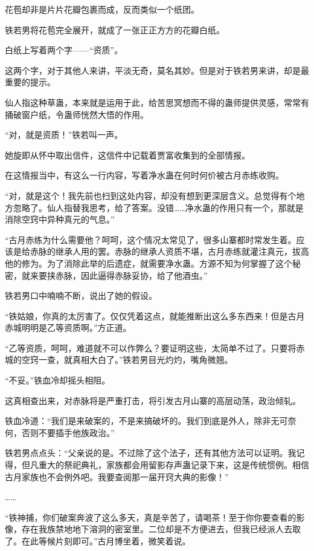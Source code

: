 \begin{this_body}
花苞却非是片片花瓣包裹而成，反而类似一个纸团。

铁若男将花苞完全展开，就成了一张正正方方的花瓣白纸。

白纸上写着两个字——“资质”。

这两个字，对于其他人来讲，平淡无奇，莫名其妙。但是对于铁若男来讲，却是最重要的提示。

仙人指这种草蛊，本来就是运用于此，给苦思冥想而不得的蛊师提供灵感，常常有捅破窗户纸，令蛊师恍然大悟的作用。

“对，就是资质！”铁若叫一声。

她旋即从怀中取出信件，这信件中记载着贾富收集到的全部情报。

在这情报当中，有这么一行内容，写着净水蛊在何时何价被古月赤练收购。

“对，就是这个！我先前也扫到这处内容，却没有想到更深层含义。总觉得有个地方忽略了。仙人指替我思考，给了答案。没错……净水蛊的作用只有一个，那就是消除空窍中异种真元的气息。”

“古月赤练为什么需要他？呵呵，这个情况太常见了，很多山寨都时常发生着。应该是给赤脉的继承人用的罢。赤脉的继承人资质不堪，古月赤练就灌注真元，拔高他的修为。为了消除此举的后遗症，就需要净水蛊。方源不知为何掌握了这个秘密，就来要挟赤脉，因此逼得赤脉妥协，给了他酒虫。”

铁若男口中喃喃不断，说出了她的假设。

“铁姑娘，你真的太厉害了。仅仅凭着这点，就能推断出这么多东西来！但是古月赤城明明是乙等资质啊。”方正道。

“乙等资质，呵呵，难道就不可以作弊么？要证明这些，太简单不过了。只要将赤城的空窍一查，就真相大白了。”铁若男目光灼灼，嘴角微翘。

“不妥。”铁血冷却摇头相阻。

这真相查出来，对赤脉将是严重打击，将引发古月山寨的高层动荡，政治倾轧。

铁血冷道：“我们是来破案的，不是来搞破坏的。我们到底是外人，除非无可奈何，否则不要插手他族政治。”

铁若男点点头：“父亲说的是。不过除了这个法子，还有其他方法可以证明。我记得，但凡重大的祭祀典礼，家族都会用留影存声蛊记录下来，这是传统惯例。相信古月家族也不会例外吧。我要查阅那一届开窍大典的影像！”

……

“铁神捕，你们破案奔波了这么多天，真是辛苦了，请喝茶！至于你你要查看的影像，存在我族禁地地下溶洞的密室里。二位却是不方便进去，但我已经派人去取了。在此等候片刻即可。”古月博坐着，微笑着说。


\end{this_body}
